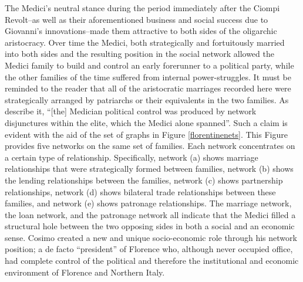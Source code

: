 The Medici's neutral stance during the period immediately after the Ciompi Revolt--as well as their aforementioned business and social success due to Giovanni's innovations--made them attractive to both sides of the oligarchic aristocracy. Over time the Medici, both strategically and fortuitously married into both sides and the resulting position in the social network allowed the Medici family to build and control an early forerunner to a political party, while the other families of the time suffered from internal power-struggles. It must be reminded to the reader that all of the aristocratic marriages recorded here were strategically arranged by patriarchs or their equivalents in the two families. As \citet[p.~1259]{Padgett1993} describe it, ``[the] Medician political control was produced by network disjunctures within the elite, which the Medici alone spanned''. Such a claim is evident with the aid of the set of graphs in Figure \ref{florentinenets}. This Figure provides five networks on the same set of families. Each network concentrates on a certain type of relationship. Specifically, network (a) shows marriage relationships that were strategically formed between families, network (b) shows the lending relationships between the families, network (c) shows partnership relationships, network (d) shows bilateral trade relationships between these families, and network (e) shows patronage relationships. The marriage network, the loan network, and the patronage network all indicate that the Medici filled a structural hole between the two opposing sides in both a social and an economic sense. Cosimo created a new and unique socio-economic role through his network position; a de facto ``president'' of Florence who, although never occupied office, had complete control of the political and therefore the institutional and economic environment of Florence and Northern Italy.

